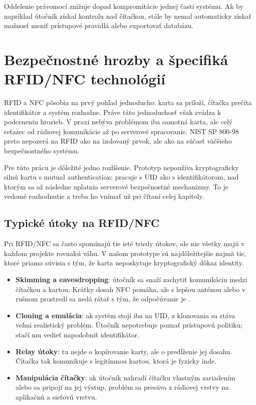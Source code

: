 \documentclass[journal,a4paper,onecolumn]{IEEEtran}
\begin{document}
Oddelenie právomocí znižuje dopad kompromitácie jednej časti systému. Ak by napríklad útočník získal kontrolu nad čítačkou, stále by nemal automaticky získať možnosť meniť prístupové pravidlá alebo exportovať databázu.



\section{Bezpečnostné hrozby a špecifiká RFID/NFC technológií}

RFID a NFC pôsobia na prvý pohľad jednoducho: karta sa priloží, čítačka prečíta identifikátor a systém rozhodne. Práve táto jednoduchosť však zvádza k podceneniu hrozieb. V praxi nebýva problémom iba samotná karta, ale celý reťazec od rádiovej komunikácie až po serverové spracovanie. NIST SP 800-98 preto nepozerá na RFID ako na izolovaný prvok, ale ako na súčasť väčšieho bezpečnostného systému\cite{NIST80098}.

Pre túto prácu je dôležité jedno rozlíšenie. Prototyp nepoužíva kryptograficky silnú kartu s mutual authentication; pracuje s UID ako s identifikátorom, nad ktorým sa až následne uplatnia serverové bezpečnostné mechanizmy. To je vedomé rozhodnutie a treba ho vnímať už pri čítaní celej kapitoly.

\subsection{Typické útoky na RFID/NFC}

Pri RFID/NFC sa často spomínajú tie isté triedy útokov, ale nie všetky majú v každom projekte rovnakú váhu. V našom prototype sú najdôležitejšie najmä tie, ktoré priamo súvisia s tým, že karta neposkytuje kryptografický dôkaz identity.

\begin{itemize}[leftmargin=*,itemsep=2pt]
  \item \textbf{Skimming a eavesdropping}: útočník sa snaží zachytiť komunikáciu medzi čítačkou a kartou. Krátky dosah NFC pomáha, ale s lepšou anténou alebo v rušnom prostredí sa nedá rátať s tým, že odpočúvanie je .
  \item \textbf{Cloning a emulácia}: ak systém stojí iba na UID, z klonovania sa stáva veľmi realistický problém. Útočník nepotrebuje poznať prístupovú politiku; stačí mu vedieť napodobniť identifikátor.
  \item \textbf{Relay útoky}: tu nejde o kopírovanie karty, ale o predĺženie jej dosahu. Čítačka tak komunikuje s legitímnou kartou, ktorá je fyzicky inde.
  \item \textbf{Manipulácia čítačky}: ak útočník nahradí čítačku vlastným zariadením alebo sa pripojí na jej výstup, problém sa presúva z rádiovej vrstvy na aplikačnú a sieťovú vrstvu.
\end{itemize}
\end{document}
